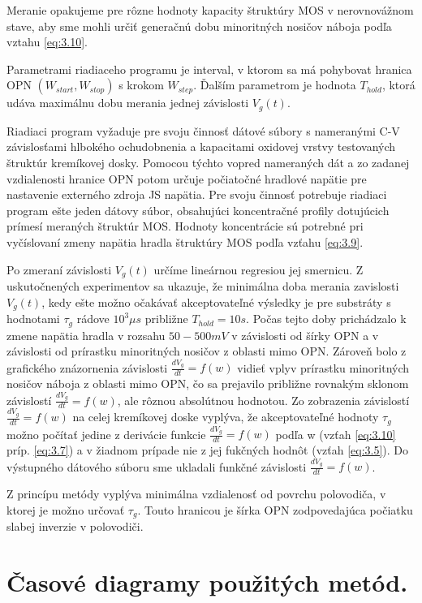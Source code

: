 Meranie opakujeme pre rôzne hodnoty kapacity štruktúry MOS v
nerovnovážnom stave, aby sme mohli určiť generačnú dobu minoritných
nosičov náboja podľa vztahu \ref{eq:3.10}.

Parametrami riadiaceho programu je interval, v ktorom sa má pohybovat
hranica OPN $(W_{start}, W_{stop})$ s krokom $W_{step}$. Ďalším
parametrom je hodnota $T_{hold}$, ktorá udáva maximálnu dobu merania
jednej závislosti $V_{g}(t)$.

Riadiaci program vyžaduje pre svoju činnosť dátové súbory s nameranými
C-V závislosťami hlbokého ochudobnenia a kapacitami oxidovej vrstvy
testovaných štruktúr kremíkovej dosky. Pomocou týchto vopred
nameraných dát a zo zadanej vzdialenosti hranice OPN potom určuje
počiatočné hradlové napätie pre nastavenie externého zdroja JS
napätia.  Pre svoju činnosť potrebuje riadiaci program ešte jeden
dátovy súbor, obsahujúci koncentračné profily dotujúcich prímesí
meraných štruktúr MOS. Hodnoty koncentrácie sú potrebné pri
vyčíslovaní zmeny napätia hradla štruktúry MOS podľa vzťahu
\ref{eq:3.9}.

Po zmeraní závislosti $V_{g}(t)$ určíme lineárnou regresiou jej
smernicu.  Z uskutočnených experimentov sa ukazuje, že minimálna doba
merania zavislosti $V_{g}(t)$, kedy ešte možno očakávať akceptovateľné
výsledky je pre substráty s hodnotami $\tau_g$ rádove
$10^{3}\mu{s}$ približne $T_{hold}=10s$. Počas tejto doby
prichádzalo k zmene napätia hradla v rozsahu $50-500 mV$ v závislosti
od šírky OPN a v závislosti od prírastku minoritných nosičov z oblasti
mimo OPN. Zároveň bolo z grafického znázornenia závislosti
$\frac{dV_g}{dt}=f(w)$ vidieť vplyv prírastku minoritných nosičov náboja
z oblasti mimo OPN, čo sa prejavilo približne rovnakým sklonom
závislostí $\frac{dV_g}{dt}=f(w)$, ale rôznou absolútnou hodnotou.  Zo
zobrazenia závislostí $\frac{dV_g}{dt}=f(w)$ na celej kremíkovej doske
vyplýva, že akceptovateľné hodnoty $\tau_{g}$ možno počítať jedine z
derivácie funkcie $\frac{dV_g}{dt}=f(w)$ podľa w (vzťah \ref{eq:3.10}
príp. \ref{eq:3.7}) a v žiadnom prípade nie z jej fukčných hodnôt
(vzťah \ref{eq:3.5}). Do výstupného dátového súboru sme ukladali
funkčné závislosti $\frac{dV_g}{dt}=f(w)$.

Z princípu metódy vyplýva minimálna vzdialenosť od povrchu polovodiča,
v ktorej je možno určovať $\tau_{g}$. Touto hranicou je šírka OPN
zodpovedajúca počiatku slabej inverzie v polovodiči.

\section{Časové diagramy použitých metód.}\label{sec:5.4}

